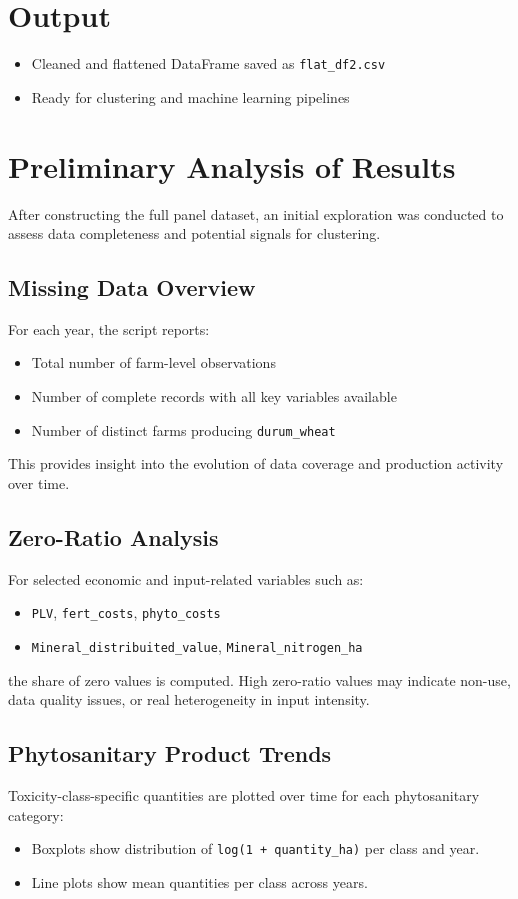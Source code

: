 \documentclass[a4paper,12pt]{article}
\begin{document}
\section{Output}
\begin{itemize}
    \item Cleaned and flattened DataFrame saved as \texttt{flat\_df2.csv}
    \item Ready for clustering and machine learning pipelines
\end{itemize}

    \section{Preliminary Analysis of Results}

After constructing the full panel dataset, an initial exploration was conducted to assess data completeness and potential signals for clustering.

\subsection{Missing Data Overview}
For each year, the script reports:
\begin{itemize}
    \item Total number of farm-level observations
    \item Number of complete records with all key variables available
    \item Number of distinct farms producing \texttt{durum\_wheat}
\end{itemize}

This provides insight into the evolution of data coverage and production activity over time.

\subsection{Zero-Ratio Analysis}
For selected economic and input-related variables such as:
\begin{itemize}
    \item \texttt{PLV}, \texttt{fert\_costs}, \texttt{phyto\_costs}
    \item \texttt{Mineral\_distribuited\_value}, \texttt{Mineral\_nitrogen\_ha}
\end{itemize}
the share of zero values is computed. High zero-ratio values may indicate non-use, data quality issues, or real heterogeneity in input intensity.

\subsection{Phytosanitary Product Trends}
Toxicity-class-specific quantities are plotted over time for each phytosanitary category:
\begin{itemize}
    \item Boxplots show distribution of \texttt{log(1 + quantity\_ha)} per class and year.
    \item Line plots show mean quantities per class across years.
\end{itemize}
\end{document}
